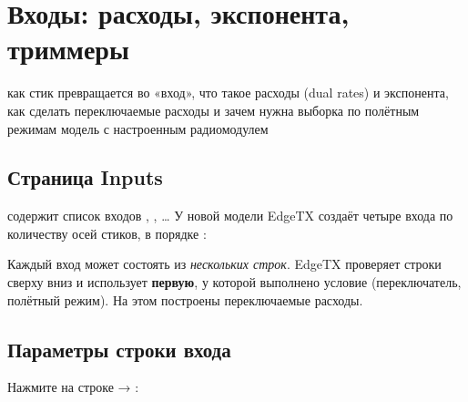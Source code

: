 \chapter{Входы: расходы, экспонента, триммеры}
\chapterintro
  {как стик превращается во «вход», что такое расходы (dual rates) и экспонента, как сделать
   переключаемые расходы и зачем нужна выборка по полётным режимам}
  {модель с настроенным радиомодулем}

\section{Страница Inputs}

 содержит список входов , , … У новой модели EdgeTX
создаёт четыре входа по количеству осей стиков, в порядке :

\begin{center}
\end{center}

Каждый вход может состоять из \emph{нескольких строк}. EdgeTX проверяет строки сверху вниз
и использует \textbf{первую}, у которой выполнено условие (переключатель, полётный режим).
На этом построены переключаемые расходы.

\section{Параметры строки входа}

Нажмите  на строке → :

